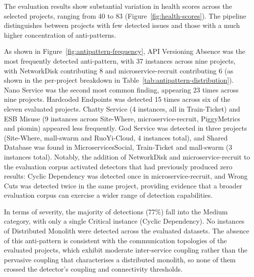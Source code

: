 \par The evaluation results show substantial variation in health scores across the selected projects, ranging from 40 to 83 (Figure~\ref{fig:health-scores}). The pipeline distinguishes between projects with few detected issues and those with a much higher concentration of anti-patterns.

\par As shown in Figure~\ref{fig:antipattern-frequency}, API Versioning Absence was the most frequently detected anti-pattern, with 37 instances across nine projects, with NetworkDisk contributing 8 and microservice-recruit contributing 6 (as shown in the per-project breakdown in Table~\ref{tab:antipattern-distribution}). Nano Service was the second most common finding, appearing 23 times across nine projects. Hardcoded Endpoints was detected 15 times across six of the eleven evaluated projects. Chatty Service (4 instances, all in Train-Ticket) and ESB Misuse (9 instances across Site-Where, microservice-recruit, PiggyMetrics and piomin) appeared less frequently. God Service was detected in three projects (Site-Where, mall-swarm and RuoYi-Cloud, 4 instances total), and Shared Database was found in MicroservicesSocial, Train-Ticket and mall-swarm (3 instances total). Notably, the addition of NetworkDisk and microservice-recruit to the evaluation corpus activated detectors that had previously produced zero results: Cyclic Dependency was detected once in microservice-recruit, and Wrong Cuts was detected twice in the same project, providing evidence that a broader evaluation corpus can exercise a wider range of detection capabilities.

\par In terms of severity, the majority of detections (77\%) fall into the Medium category, with only a single Critical instance (Cyclic Dependency). No instances of Distributed Monolith were detected across the evaluated datasets. The absence of this anti-pattern is consistent with the communication topologies of the evaluated projects, which exhibit moderate inter-service coupling rather than the pervasive coupling that characterises a distributed monolith, so none of them crossed the detector's coupling and connectivity thresholds.

